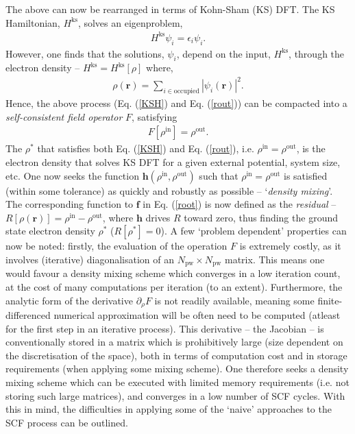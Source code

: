 The above can now be rearranged in terms of Kohn-Sham (KS) DFT. The KS Hamiltonian, $H^{\text{ks}}$, solves an eigenproblem,
\begin{align}
\label{KSH}
H^{\text{ks}} \psi_i = \epsilon_i \psi_i. 
\end{align} 
However, one finds that the solutions, $\psi_i$, depend on the input, $H^{\text{ks}}$, through the electron density -- $H^{\text{ks}} = H^{\text{ks}}[\rho]$ where,
\begin{align}
\label{rout}
\rho(\textbf{r}) = \sum_{i \in \text{occupied}} |\psi_i(\textbf{r})|^2.
\end{align} 
Hence, the above process (Eq$.$ (\ref{KSH}) and Eq$.$ (\ref{rout})) can be compacted into a \textit{self-consistent field operator} $F$, satisfying
\begin{align}
F[\rho^{\text{in}}] = \rho^{\text{out}}. 
\end{align} 
The $\rho^*$ that satisfies both Eq$.$ (\ref{KSH}) and Eq$.$ (\ref{rout}), i.e. $\rho^{\text{in}} = \rho^{\text{out}}$, is the electron density that solves KS DFT for a given external potential, system size, etc. One now seeks the function $\textbf{h}(\rho^{\text{in}}, \rho^{\text{out}})$ such that $\rho^{\text{in}} = \rho^{\text{out}}$ is satisfied (within some tolerance) as quickly and robustly as possible -- `\textit{density mixing}'.  The corresponding function to $\textbf{f}$ in Eq$.$ (\ref{root}) is now defined as the \textit{residual} -- $R[\rho(\textbf{r})] =  \rho^{\text{in}} - \rho^{\text{out}}$, where $\textbf{h}$ drives $R$ toward zero, thus finding the ground state electron density $\rho^*$ ($R[\rho^*] = 0$). A few `problem dependent' properties can now be noted: firstly, the evaluation of the operation $F$ is extremely costly, as it involves (iterative) diagonalisation of an $N_{\text{pw}} \times N_{\text{pw}}$ matrix. This means one would favour a density mixing scheme which converges in a low iteration count, at the cost of many computations per iteration (to an extent). Furthermore, the analytic form of the derivative $\partial_{\rho} F$ is not readily available, meaning some finite-differenced numerical approximation will be often need to be computed (atleast for the first step in an iterative process). This derivative -- the Jacobian -- is conventionally stored in a matrix which is prohibitively large (size dependent on the discretisation of the space), both in terms of computation cost and in storage requirements (when applying some mixing scheme). One therefore seeks a density mixing scheme which can be executed with limited memory requirements (i.e. not storing such large matrices), and converges in a low number of SCF cycles. With this in mind, the difficulties in applying some of the `naive' approaches to the SCF process can be outlined. 








